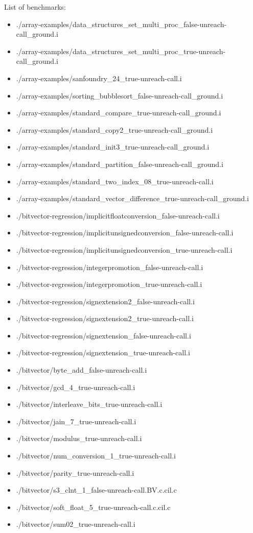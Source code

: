 \documentclass[envcountsame]{llncs}
\begin{document}
\noindent
List of benchmarks:
\begin{itemize}
\item ./array-examples/data\_structures\_set\_multi\_proc\_false-unreach-call\_ground.i
\item ./array-examples/data\_structures\_set\_multi\_proc\_true-unreach-call\_ground.i
\item ./array-examples/sanfoundry\_24\_true-unreach-call.i
\item ./array-examples/sorting\_bubblesort\_false-unreach-call\_ground.i
\item ./array-examples/standard\_compare\_true-unreach-call\_ground.i
\item ./array-examples/standard\_copy2\_true-unreach-call\_ground.i
\item ./array-examples/standard\_init3\_true-unreach-call\_ground.i
\item ./array-examples/standard\_partition\_false-unreach-call\_ground.i
\item ./array-examples/standard\_two\_index\_08\_true-unreach-call.i
\item ./array-examples/standard\_vector\_difference\_true-unreach-call\_ground.i


\item ./bitvector-regression/implicitfloatconversion\_false-unreach-call.i
\item ./bitvector-regression/implicitunsignedconversion\_false-unreach-call.i
\item ./bitvector-regression/implicitunsignedconversion\_true-unreach-call.i
\item ./bitvector-regression/integerpromotion\_false-unreach-call.i
\item ./bitvector-regression/integerpromotion\_true-unreach-call.i
\item ./bitvector-regression/signextension2\_false-unreach-call.i
\item ./bitvector-regression/signextension2\_true-unreach-call.i
\item ./bitvector-regression/signextension\_false-unreach-call.i
\item ./bitvector-regression/signextension\_true-unreach-call.i


\item ./bitvector/byte\_add\_false-unreach-call.i
\item ./bitvector/gcd\_4\_true-unreach-call.i
\item ./bitvector/interleave\_bits\_true-unreach-call.i
\item ./bitvector/jain\_7\_true-unreach-call.i
\item ./bitvector/modulus\_true-unreach-call.i
\item ./bitvector/num\_conversion\_1\_true-unreach-call.i
\item ./bitvector/parity\_true-unreach-call.i
\item ./bitvector/s3\_clnt\_1\_false-unreach-call.BV.c.cil.c
\item ./bitvector/soft\_float\_5\_true-unreach-call.c.cil.c
\item ./bitvector/sum02\_true-unreach-call.i



\end{itemize}
\end{document}
